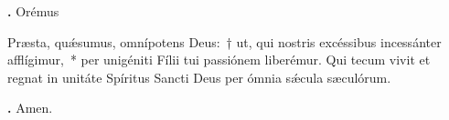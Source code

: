 \textbf{\Vbar.} Orémus

Præsta, qu\'{\ae}sumus, omnípotens Deus:~† ut, qui nostris excéssibus incessánter afflígimur,~* per unigéniti Fílii tui passiónem liberémur. 
Qui tecum vivit et regnat in unitáte Spíritus Sancti Deus per ómnia s\'{\ae}cula sæculórum.

\textbf{\Rbar.} Amen.

